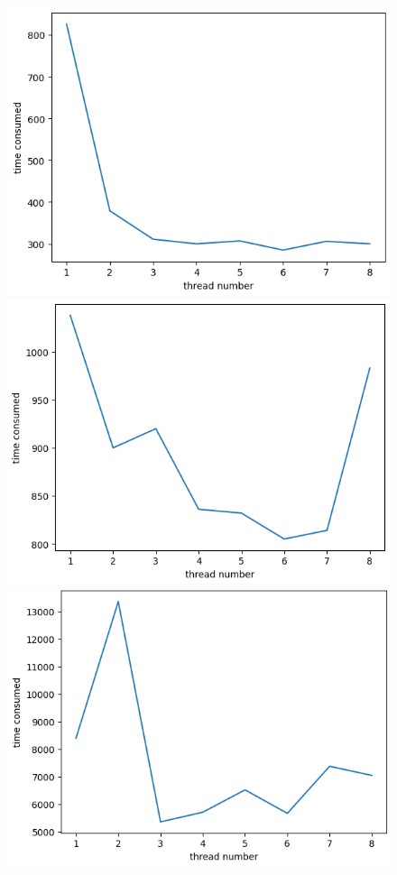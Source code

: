 \documentclass[]{article}
\begin{document}
\begin{figure}[H]
    \includegraphics[scale = 0.6]{2023-03-25-13-56-26.png}
    \includegraphics[scale = 0.6]{2023-03-25-13-57-34.png}
    \includegraphics[scale = 0.6]{2023-03-25-13-57-52.png}

\end{figure}
\end{document}
